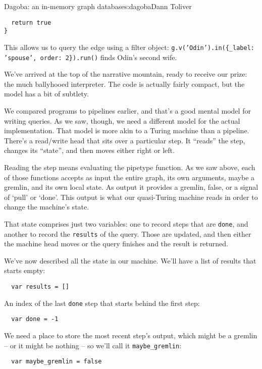 \begin{aosachapter}{Dagoba: an in-memory graph database}{s:dagoba}{Dann Toliver}
\begin{verbatim}
  return true 
}
\end{verbatim}

This allows us to query the edge using a filter object:
\texttt{g.v('Odin').in(\{\_label: 'spouse', order: 2\}).run()} finds
Odin's second wife.

\label{the-interpreters-nature}

We've arrived at the top of the narrative mountain, ready to receive our
prize: the much ballyhooed interpreter. The code is actually fairly
compact, but the model has a bit of subtlety.

We compared programs to pipelines earlier, and that's a good mental
model for writing queries. As we saw, though, we need a different model
for the actual implementation. That model is more akin to a Turing
machine than a pipeline. There's a read/write head that sits over a
particular step. It ``reads'' the step, changes its ``state'', and then
moves either right or left.

Reading the step means evaluating the pipetype function. As we saw
above, each of those functions accepts as input the entire graph, its
own arguments, maybe a gremlin, and its own local state. As output it
provides a gremlin, false, or a signal of `pull' or `done'. This output
is what our quasi-Turing machine reads in order to change the machine's
state.

That state comprises just two variables: one to record steps that are
\texttt{done}, and another to record the \texttt{results} of the query.
Those are updated, and then either the machine head moves or the query
finishes and the result is returned.

We've now described all the state in our machine. We'll have a list of
results that starts empty:

\begin{verbatim}
  var results = []
\end{verbatim}

An index of the last \texttt{done} step that starts behind the first
step:

\begin{verbatim}
  var done = -1
\end{verbatim}

We need a place to store the most recent step's output, which might be a
gremlin -- or it might be nothing -- so we'll call it
\texttt{maybe\_gremlin}:

\begin{verbatim}
  var maybe_gremlin = false
\end{verbatim}


\end{aosachapter}
